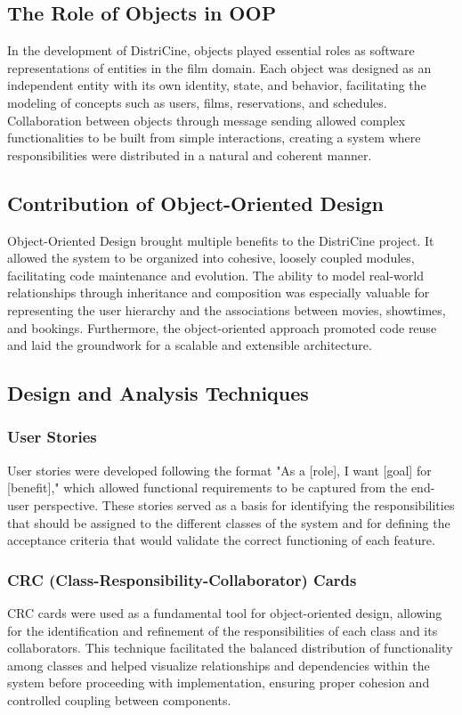 \documentclass[12pt]{article}
\begin{document}
\subsection{The Role of Objects in OOP}
In the development of DistriCine, objects played essential roles as software representations of entities in the film domain. Each object was designed as an independent entity with its own identity, state, and behavior, facilitating the modeling of concepts such as users, films, reservations, and schedules. Collaboration between objects through message sending allowed complex functionalities to be built from simple interactions, creating a system where responsibilities were distributed in a natural and coherent manner.

\subsection{Contribution of Object-Oriented Design}
Object-Oriented Design brought multiple benefits to the DistriCine project. It allowed the system to be organized into cohesive, loosely coupled modules, facilitating code maintenance and evolution. The ability to model real-world relationships through inheritance and composition was especially valuable for representing the user hierarchy and the associations between movies, showtimes, and bookings. Furthermore, the object-oriented approach promoted code reuse and laid the groundwork for a scalable and extensible architecture.

\subsection{Design and Analysis Techniques}

\subsubsection{User Stories}
User stories were developed following the format "As a [role], I want [goal] for [benefit]," which allowed functional requirements to be captured from the end-user perspective. These stories served as a basis for identifying the responsibilities that should be assigned to the different classes of the system and for defining the acceptance criteria that would validate the correct functioning of each feature.

\subsubsection{CRC (Class-Responsibility-Collaborator) Cards}
CRC cards were used as a fundamental tool for object-oriented design, allowing for the identification and refinement of the responsibilities of each class and its collaborators. This technique facilitated the balanced distribution of functionality among classes and helped visualize relationships and dependencies within the system before proceeding with implementation, ensuring proper cohesion and controlled coupling between components.
\end{document}
